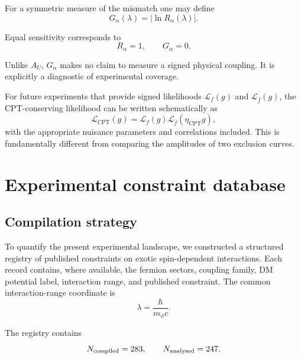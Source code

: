 \documentclass[aps,prd,reprint,superscriptaddress,nofootinbib]{revtex4-2}
\newcommand{\CPT}{\mathrm{CPT}}
\begin{document}
	For a symmetric measure of the mismatch one may define
	\begin{equation}
		G_\alpha(\lambda)
		=
		\left|\ln R_\alpha(\lambda)\right|.
		\label{eq:G}
	\end{equation}
	
	Equal sensitivity corresponds to
	\begin{equation}
		R_\alpha=1,
		\qquad
		G_\alpha=0.
	\end{equation}
	
	Unlike $A_U$, $G_\alpha$ makes no claim to measure a signed physical
	coupling. It is explicitly a diagnostic of experimental coverage.
	
	For future experiments that provide signed likelihoods
	$\mathcal L_f(g)$ and $\mathcal L_{\bar f}(g)$, the CPT-conserving
	likelihood can be written schematically as
	\begin{equation}
		\mathcal L_{\CPT}(g)
		=
		\mathcal L_f(g)
		\mathcal L_{\bar f}(\eta_\CPT g),
	\end{equation}
	with the appropriate nuisance parameters and correlations included.
	This is fundamentally different from comparing the amplitudes of two
	exclusion curves.
	
	\section{Experimental constraint database}
	
	\subsection{Compilation strategy}
	
	To quantify the present experimental landscape, we constructed a
	structured registry of published constraints on exotic spin-dependent
	interactions. Each record contains, where available, the fermion
	sectors, coupling family, DM potential label, interaction range, and
	published constraint. The common interaction-range coordinate is
	\begin{equation}
		\lambda=\frac{\hbar}{m_\phi c}.
	\end{equation}
	
	The registry contains
	\begin{equation}
		N_{\rm compiled}=283,
		\qquad
		N_{\rm analysed}=247.
		\label{eq:Nrecords}
	\end{equation}
	
\end{document}
